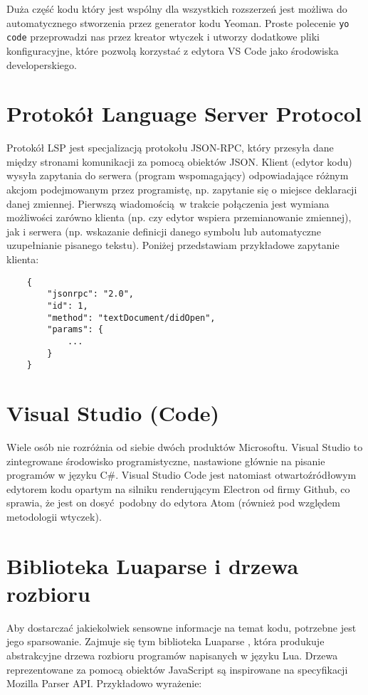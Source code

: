 Duża część kodu który jest wspólny dla wszystkich rozszerzeń jest możliwa do automatycznego stworzenia przez generator kodu Yeoman. Proste polecenie \texttt{yo code} przeprowadzi nas przez kreator wtyczek i utworzy dodatkowe pliki konfiguracyjne, które pozwolą korzystać z edytora VS Code jako środowiska developerskiego.

\section{Protokół Language Server Protocol}
Protokół LSP \cite{docs} jest specjalizacją protokołu JSON-RPC, który przesyła dane między stronami komunikacji za pomocą obiektów JSON. Klient (edytor kodu) wysyła zapytania do serwera (program wspomagający) odpowiadające różnym akcjom podejmowanym przez programistę, np. zapytanie się o miejsce deklaracji danej zmiennej. Pierwszą wiadomością w trakcie połączenia jest wymiana możliwości zarówno klienta (np. czy edytor wspiera przemianowanie zmiennej), jak i serwera (np. wskazanie definicji danego symbolu lub automatyczne uzupełnianie pisanego tekstu). Poniżej przedstawiam przykładowe zapytanie klienta:

\begin{lstlisting}
    {
        "jsonrpc": "2.0",
        "id": 1,
        "method": "textDocument/didOpen",
        "params": {
            ...
        }
    }
\end{lstlisting}

\section{Visual Studio (Code)}
Wiele osób nie rozróżnia od siebie dwóch produktów Microsoftu. Visual Studio to zintegrowane środowisko programistyczne, nastawione głównie na pisanie programów w języku C\#. Visual Studio Code jest natomiast otwartoźródłowym edytorem kodu opartym na silniku renderującym Electron od firmy Github, co sprawia, że jest on dosyć podobny do edytora Atom (również pod względem metodologii wtyczek). 

\section{Biblioteka Luaparse i drzewa rozbioru}
Aby dostarczać jakiekolwiek sensowne informacje na temat kodu, potrzebne jest jego sparsowanie. Zajmuje się tym biblioteka Luaparse \cite{luaparse}, która produkuje abstrakcyjne drzewa rozbioru programów napisanych w języku Lua. Drzewa reprezentowane za pomocą obiektów JavaScript są inspirowane na specyfikacji Mozilla Parser API. Przykładowo wyrażenie:

